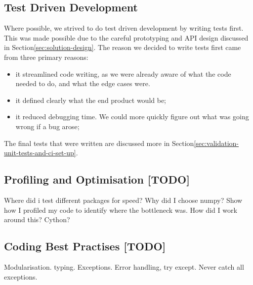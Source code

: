     \subsection{Test Driven Development}\label{subsec:test-driven-development}
    Where possible, we strived to do test driven development by writing tests first.
    This was made possible due to the careful prototyping and API design discussed in Section\eqref{sec:solution-design}.
    The reason we decided to write tests first came from three primary reasons:
    \begin{itemize}
        \item it streamlined code writing, as we were already aware of what the code needed to do, and what the edge cases
        were.
        \item it defined clearly what the end product would be;
        \item it reduced debugging time.
        We could more quickly figure out what was going wrong if a bug arose;
    \end{itemize}
    The final tests that were written are discussed more in Section\eqref{sec:validation-unit-tests-and-ci-set-up}.

    \subsection{Profiling and Optimisation [TODO]}\label{subsec:profiling-and-optimisation}
    Where did i test different packages for speed? Why did I choose numpy?
    Show how I profiled my code to identify where the bottleneck was.
    How did I work around this? Cython?

    \subsection{Coding Best Practises [TODO]}\label{subsec:coding-best-practises}
    Modularisation.
    typing.
    Exceptions. Error handling, try except. Never catch all exceptions.